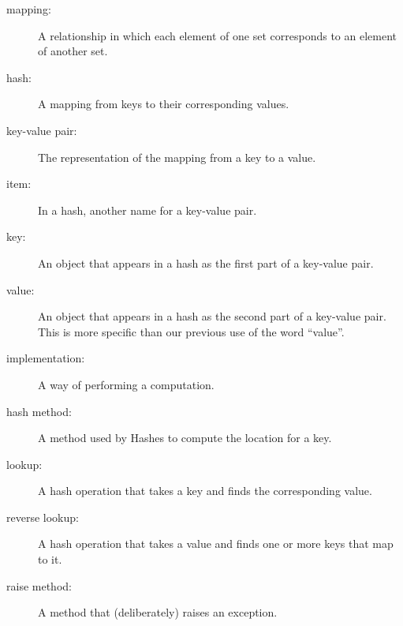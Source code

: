 \documentclass[10pt]{book}
\begin{document}
\begin{description}

\item[mapping:] A relationship in which each element of one set
corresponds to an element of another set.

\item[hash:] A mapping from keys to their
corresponding values.

\item[key-value pair:] The representation of the mapping from
a key to a value.

\item[item:] In a hash, another name for a key-value
  pair.

\item[key:] An object that appears in a hash as the
first part of a key-value pair.

\item[value:] An object that appears in a hash as the
second part of a key-value pair.  This is more specific than
our previous use of the word ``value''.

\item[implementation:] A way of performing a computation.


\item[hash method:] A method used by Hashes to compute the
location for a key.


\item[lookup:] A hash operation that takes a key and finds
the corresponding value.

\item[reverse lookup:] A hash operation that takes a value and finds
one or more keys that map to it.

\item[raise method:]  A method that (deliberately) raises an exception.


\end{description}
\end{document}

